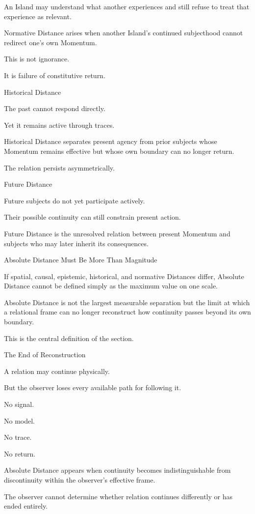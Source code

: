 An Island may understand what another experiences and still refuse to treat that experience as relevant.

Normative Distance arises when another Island’s continued subjecthood cannot redirect one’s own Momentum.

This is not ignorance.

It is failure of constitutive return.

Historical Distance

The past cannot respond directly.

Yet it remains active through traces.

Historical Distance separates present agency from prior subjects whose Momentum remains effective but whose own boundary can no longer return.

The relation persists asymmetrically.

Future Distance

Future subjects do not yet participate actively.

Their possible continuity can still constrain present action.

Future Distance is the unresolved relation between present Momentum and subjects who may later inherit its consequences.

Absolute Distance Must Be More Than Magnitude

If spatial, causal, epistemic, historical, and normative Distances differ, Absolute Distance cannot be defined simply as the maximum value on one scale.

Absolute Distance is not the largest measurable separation but the limit at which a relational frame can no longer reconstruct how continuity passes beyond its own boundary.

This is the central definition of the section.

The End of Reconstruction

A relation may continue physically.

But the observer loses every available path for following it.

No signal.

No model.

No trace.

No return.

Absolute Distance appears when continuity becomes indistinguishable from discontinuity within the observer’s effective frame.

The observer cannot determine whether relation continues differently or has ended entirely.

